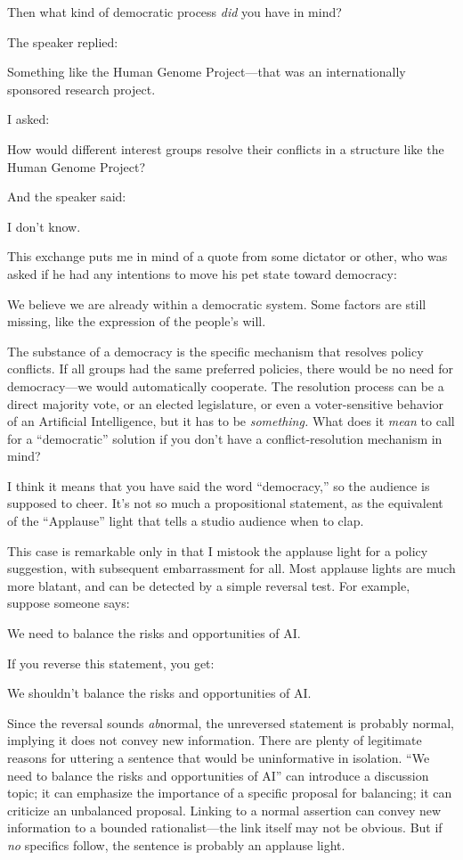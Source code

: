 {
 Then what kind of democratic process \textit{did} you have in
mind?}

{
 The speaker replied:}

{
 Something like the Human Genome Project---that was an
internationally sponsored research project.}

{
 I asked:}

{
 How would different interest groups resolve their conflicts in a
structure like the Human Genome Project?}

{
 And the speaker said:}

{
 I don't know.}

{
 This exchange puts me in mind of a quote from some dictator or
other, who was asked if he had any intentions to move his pet state
toward democracy:}

{
 We believe we are already within a democratic system. Some factors
are still missing, like the expression of the people's
will.}

{
 The substance of a democracy is the specific mechanism that
resolves policy conflicts. If all groups had the same preferred
policies, there would be no need for democracy---we would automatically
cooperate. The resolution process can be a direct majority vote, or an
elected legislature, or even a voter-sensitive behavior of an
Artificial Intelligence, but it has to be \textit{something.} What does
it \textit{mean} to call for a
``democratic'' solution if you
don't have a conflict-resolution mechanism in mind?}

{
 I think it means that you have said the word
``democracy,'' so the audience is
supposed to cheer. It's not so much a propositional
statement, as the equivalent of the
``Applause'' light that tells a
studio audience when to clap.}

{
 This case is remarkable only in that I mistook the applause light
for a policy suggestion, with subsequent embarrassment for all. Most
applause lights are much more blatant, and can be detected by a simple
reversal test. For example, suppose someone says:}

{
 We need to balance the risks and opportunities of AI.}

{
 If you reverse this statement, you get:}

{
 We shouldn't balance the risks and opportunities
of AI.}

{
 Since the reversal sounds \textit{ab}normal, the unreversed
statement is probably normal, implying it does not convey new
information. There are plenty of legitimate reasons for uttering a
sentence that would be uninformative in isolation.
``We need to balance the risks and opportunities of
AI'' can introduce a discussion topic; it can
emphasize the importance of a specific proposal for balancing; it can
criticize an unbalanced proposal. Linking to a normal assertion can
convey new information to a bounded rationalist---the link itself may
not be obvious. But if \textit{no} specifics follow, the sentence is
probably an applause light.}

